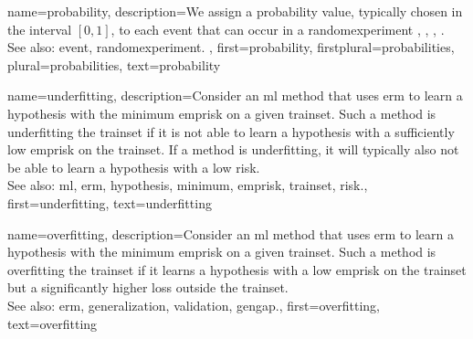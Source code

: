 {name={probability}, 
	description={We assign a probability value, typically chosen in the 
		interval $[0,1]$, to each \gls{event} that can occur in a \gls{randomexperiment}  
		\cite{BillingsleyProbMeasure}, \cite{BertsekasProb}, \cite{HalmosMeasure},  \cite{KallenbergBook}.
		\\
		See also: \gls{event}, \gls{randomexperiment}. },
	first={probability},
	firstplural={probabilities},
	plural={probabilities},
	text={probability}
}
	
{name={underfitting},
	description={Consider 
		an \gls{ml} method that uses \gls{erm} to learn a \gls{hypothesis} with the \gls{minimum} \gls{emprisk} 
		on a given \gls{trainset}. Such a method is underfitting the \gls{trainset} if it is 
		not able to learn a \gls{hypothesis} with a sufficiently low \gls{emprisk} on the \gls{trainset}. 
		If a method is underfitting, it will typically also not be able to learn a \gls{hypothesis} with 
		a low \gls{risk}.
					\\ 
		See also: \gls{ml}, \gls{erm}, \gls{hypothesis}, \gls{minimum}, \gls{emprisk}, \gls{trainset}, \gls{risk}.},
	first={underfitting},
	text={underfitting}
}

{name={overfitting},
	description={Consider an 
		\gls{ml} method that uses \gls{erm} to learn a \gls{hypothesis} with the \gls{minimum} \gls{emprisk} on 
		a given \gls{trainset}. Such a method is overfitting the \gls{trainset} if it learns 
		a \gls{hypothesis} with a low \gls{emprisk} on the \gls{trainset} but a significantly higher \gls{loss} outside the \gls{trainset}.
					\\ 
		See also: \gls{erm}, \gls{generalization}, \gls{validation}, \gls{gengap}.},
	first={overfitting},
	text={overfitting}
}

